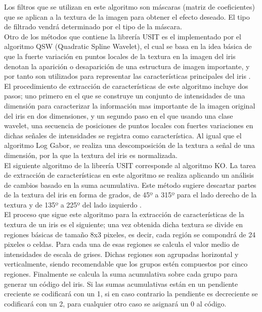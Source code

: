 Los filtros que se utilizan en este algoritmo son máscaras (matriz de coeficientes) que se aplican a la textura de la imagen para obtener el efecto deseado. El tipo de filtrado vendrá determinado por el tipo de la máscara. \\

Otro de los métodos que contiene la librería USIT es el implementado por el algoritmo QSW (Quadratic Spline Wavelet), el cual se basa en la idea básica de que la fuerte variación en puntos locales de la textura en la imagen del iris denotan la aparición o desaparición de una estructura de imagen importante, y por tanto son utilizados para representar las características principales del iris \cite{Reference18} \cite{Reference19}.\\

El procedimiento de extracción de características de este algoritmo incluye dos pasos; uno primero en el que se construye un conjunto de intensidades de una dimensión para caracterizar la información mas importante de la imagen original del iris en dos dimensiones, y un segundo paso en el que usando una clase wavelet, una secuencia de posiciones de puntos locales con fuertes variaciones en dichas señales de intensidades se registra como característica. Al igual que el algoritmo Log Gabor, se realiza una descomposición de la textura a señal de una dimensión, por la que la textura del iris es normalizada. \\

El siguiente algoritmo de la librería USIT corresponde al algoritmo KO. La tarea de extracción de características en este algoritmo se realiza aplicando un análisis de cambios basado en la suma acumulativa. Este método sugiere descartar partes de la textura del iris en forma de grados, de 45º a 315º para el lado derecho de la textura y de 135º a 225º del lado izquierdo \cite{Reference18} \cite{Reference19}. \\

El proceso que sigue este algoritmo para la extracción de características de la textura de un iris es el siguiente; una vez obtenida dicha textura se divide en regiones básicas de tamaño 8x3 pixeles, es decir, cada región se compondrá de 24 pixeles o celdas. Para cada una de esas regiones se calcula el valor medio de intensidades de escala de grises. Dichas regiones son agrupadas horizontal y verticalmente, siendo recomendable que los grupos estén compuestos por cinco regiones. Finalmente se calcula la suma acumulativa sobre cada grupo para generar un código del iris. Si las sumas acumulativas están en un pendiente creciente se codificará con un 1, si en caso contrario la pendiente es decreciente se codificará con un 2, para cualquier otro caso se asignará un 0 al código. \\

